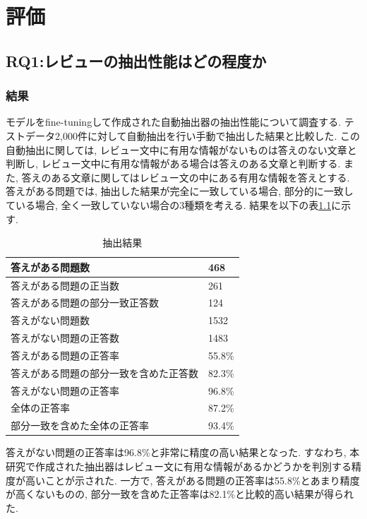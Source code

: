 \chapter{評価}
\label{chap:kekkahyouka}

\section{RQ1:レビューの抽出性能はどの程度か}
\subsection{結果}
モデルをfine-tuningして作成された自動抽出器の抽出性能について調査する. テストデータ2,000件に対して自動抽出を行い手動で抽出した結果と比較した. この自動抽出に関しては, レビュー文中に有用な情報がないものは答えのない文章と判断し, レビュー文中に有用な情報がある場合は答えのある文章と判断する. また, 答えのある文章に関してはレビュー文の中にある有用な情報を答えとする. 
答えがある問題では, 抽出した結果が完全に一致している場合, 部分的に一致している場合, 全く一致していない場合の3種類を考える. 結果を以下の表\ref{tb:qa}に示す. 

\begin{table}[htbp]
  \caption{抽出結果}
  \label{tb:qa}
  \begin{center}
  \begin{tabularx}{\linewidth}{|X|X|}
    \hline
    答えがある問題数&468\\\hline
    答えがある問題の正当数&261\\\hline
    答えがある問題の部分一致正答数&124\\\hline
    答えがない問題数&1532\\\hline
    答えがない問題の正答数&1483\\\hline
    \hline
    答えがある問題の正答率&55.8\%\\\hline
    答えがある問題の部分一致を含めた正答数&82.3\%\\\hline
    答えがない問題の正答率&96.8\%\\\hline
    \hline
    全体の正答率&87.2\%\\\hline
    部分一致を含めた全体の正答率&93.4\%\\\hline
  \end{tabularx}\end{center}
\end{table}

答えがない問題の正答率は96.8\%と非常に精度の高い結果となった. すなわち, 本研究で作成された抽出器はレビュー文に有用な情報があるかどうかを判別する精度が高いことが示された. 
一方で, 答えがある問題の正答率は55.8\%とあまり精度が高くないものの, 部分一致を含めた正答率は82.1\%と比較的高い結果が得られた. 

